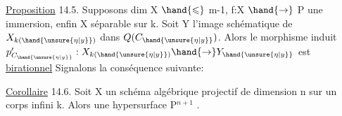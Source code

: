 
\uline{Proposition} 14.5. Supposons dim X $\hand{\leqslant}$ m-1, 
 f:X $\hand{\to}$ P une immersion,  enfin X séparable sur k. Soit Y l'image
schématique de $X_{k(\hand{\unsure{\eta|y}})}$ dans $Q(C_{\hand{\unsure{\eta|y}}})$. Alors le morphisme induit
$p'_{C_{\hand{\unsure{\eta|y}}}} : X_{k(\hand{\unsure{\eta|y}})} \hand{\to} Y_{\hand{\unsure{\eta|y}}}$ est \uline{birationnel}
Signalons la conséquence suivante:

\uline{Corollaire} 14.6. Soit X un schéma algébrique projectif  
de dimension n sur un corps infini k. Alors  
  une hypersurface  P$^{n+1}$ .

